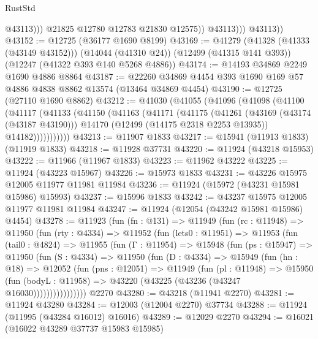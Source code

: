 \begin{lexlean}{RustStd}
\begin{coremodule}
{\begin{coremodule}
{{{{{{{{{{{{{{{{{{{{{{{{{{{{{{{{{{{{{{{{{{{{{{{{{{{{{{{{{{{{{{{{{{{{{{{{{{{{{{{{                        @43113)))
                  @21825
                  @12780
                  @12783
                  @21830
                  @12575))
              @43113)))
        @43113))
@43152 := @12725 (@36177 @1690 @8199)
@43169 := @41279
    (@41328 (@41333 (@43149 @43152)))
    (@14044 (@41310 @24))
    (@12499 (@41315 @141 @393))
    (@12247 (@41322 @393 @140 @5268 @4886))
@43174 := @14193 @34869 @2249 @1690 @4886 @8864
@43187 := @22260 @34869 @4454 @393 @1690 @169 @57 @4886 @4838 @8862 @13574 (@13464 @34869 @4454)
@43190 := @12725 (@27110 @1690 @8862)
@43212 := @41030
    (@41055
      (@41096
        (@41098
          (@41100
            (@41117
              (@41133
                (@41150
                  (@41163
                    (@41171
                      (@41175
                        (@41261
                          (@43169 (@43174 (@43187 @43190)))
                          @14170
                          (@12499 (@14175 @2318 @2253 @13935))
                          @14182)))))))))))
@43213 := @11907 @1833
@43217 := @15941 (@11913 @1833) (@11919 @1833)
@43218 := @11928 @37731
@43220 := @11924 (@43218 @15953)
@43222 := @11966 (@11967 @1833)
@43223 := @11962 @43222
@43225 := @11924 (@43223 @15967)
@43226 := @15973 @1833
@43231 := @43226 @15975 @12005 @11977 @11981 @11984
@43236 := @11924 (@15972 (@43231 @15981 @15986) @15993)
@43237 := @15996 @1833
@43242 := @43237 @15975 @12005 @11977 @11981 @11984
@43247 := @11924 (@12054 (@43242 @15981 @15986) @4454)
@43278 := @11923
    (fun (fn : @131) =>
    @11949
      (fun (rc : @11948) =>
      @11950
        (fun (rty : @4334) =>
        @11952
          (fun (lets0 : @11951) =>
          @11953
            (fun (tail0 : @4824) =>
            @11955
              (fun (Γ : @11954) =>
              @15948
                (fun (ps : @15947) =>
                @11950
                  (fun (S : @4334) =>
                  @11950
                    (fun (D : @4334) =>
                    @15949
                      (fun (hn : @18) =>
                      @12052
                        (fun (pns : @12051) =>
                        @11949
                          (fun (pl : @11948) =>
                          @15950
                            (fun (bodyL : @11958) =>
                            @43220 (@43225 (@43236 (@43247 @16030))))))))))))))))
    @2270
@43280 := @43218 (@11941 @2270)
@43281 := @11924 @43280
@43284 := @12003 (@12004 @2270) @37734
@43288 := @11924 (@11995 (@43284 @16012) @16016)
@43289 := @12029 @2270
@43294 := @16021 (@16022 @43289 @37737 @15983 @15985)
}}}}}}}}}}}}}}}}}}}}}}}}}}}}}}}}}}}}}}}}}}}}}}}}}}}}}}}}}}}}}}}}}}}}}}}}}}}}}}}}
\end{coremodule}}
\end{coremodule}
\end{lexlean}
